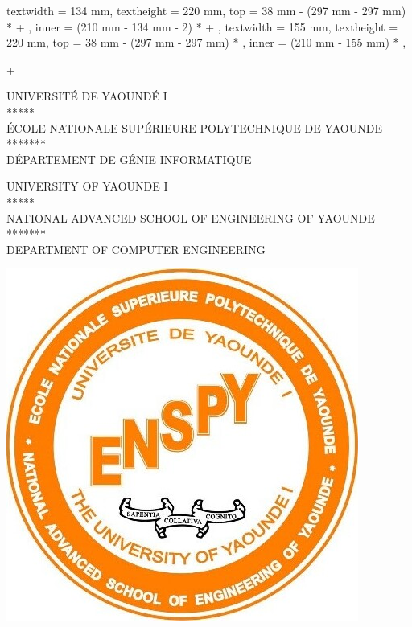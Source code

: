 
\ifprintVersion
    \newgeometry
    {
        textwidth = 134 mm,
        textheight = 220 mm,
        top = 38 mm - (297 mm - 297 mm) *  + \extraborderlength,
        inner = (210 mm - 134 mm - 2\extraborderlength ) *   + \extraborderlength,
    }
\else
    \newgeometry
    {
        textwidth = 155 mm,
        textheight = 220 mm,
        top = 38 mm - (297 mm - 297 mm) * ,
        inner = (210 mm - 155 mm) * ,
    }
\fi
{}
\begin{titlingpage}
\begin{singlespace}+
	\hspace{-1.5cm}
    \begin{minipage}{0.45\textwidth}
		\begin{center}
			UNIVERSITÉ DE YAOUNDÉ I \\
			*****\\
			ÉCOLE NATIONALE SUPÉRIEURE POLYTECHNIQUE DE YAOUNDE\\
			*******\\
			DÉPARTEMENT DE GÉNIE INFORMATIQUE\\
		\end{center}
	\end{minipage}
	\hspace{3cm}
    \begin{minipage}{0.45\textwidth}\raggedright
    	\begin{center}
    			UNIVERSITY OF YAOUNDE I\\
    		*****\\
    		NATIONAL ADVANCED SCHOOL OF ENGINEERING OF YAOUNDE\\
    		*******\\
    		DEPARTMENT OF COMPUTER ENGINEERING\\
    	\end{center}
    \end{minipage}
    \vspace*{0.5mm}
    
    \begin{center}
        \includegraphics[height = 3 cm]{resources/ensp_logo.jpg}
    \end{center}
    

\end{singlespace}
\end{titlingpage}
